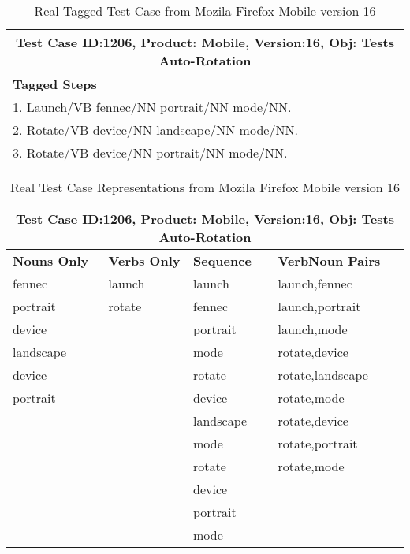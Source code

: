 \documentclass[conference]{IEEEtran}
\begin{document}
\begin{table}[!t]
\centering
\caption{Real Tagged Test Case from Mozila Firefox Mobile version 16 }
\begin{tabular}{ ||p{7cm}||  }
 \hline
 \multicolumn{1}{|c|}{\centering Test Case ID:1206, Product: Mobile, Version:16, Obj: Tests Auto-Rotation} \\
 \hline
 \hline
 \textbf{Tagged Steps} \\
 \hline
 1. Launch/VB fennec/NN portrait/NN mode/NN. \\
 \hline
 2. Rotate/VB device/NN landscape/NN mode/NN. \\
 \hline
 3. Rotate/VB device/NN portrait/NN mode/NN.\\
 \hline
\end{tabular}
\label{table:4}
\end{table}



\begin{table}[!t]
\centering
\caption{Real Test Case Representations from Mozila Firefox Mobile version 16 }
\begin{tabular}{ ||p{1.35cm}|p{1.35cm}|p{1.35cm}|p{1.65cm}||  }
 \hline
 \multicolumn{4}{|c|}{\centering Test Case ID:1206, Product: Mobile, Version:16, Obj: Tests Auto-Rotation} \\
 \hline
 \hline
 \textbf{Nouns Only} & \textbf{Verbs Only} & \textbf{Sequence} & \textbf{VerbNoun Pairs} \\
 \hline
fennec	 & launch & launch    & launch,fennec    \\
 \hline
portrait & rotate & fennec    & launch,portrait  \\
 \hline
device	 & 		  & portrait  & launch,mode      \\
 \hline
landscape&  	  & mode      & rotate,device    \\
 \hline
device	 & 		  & rotate    & rotate,landscape \\
 \hline
portrait & 		  & device    & rotate,mode      \\
 \hline
         &        & landscape & rotate,device    \\
 \hline
         &        & mode      & rotate,portrait  \\
 \hline
         &        & rotate    & rotate,mode      \\
 \hline
         &        & device    &                  \\
 \hline
         &        & portrait  &                  \\
 \hline
         &        & mode      &                  \\
 \hline
\end{tabular}
\label{table:5}
\end{table}
\end{document}
